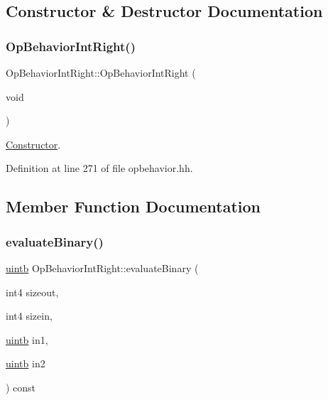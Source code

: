 \subsection{Constructor \& Destructor Documentation}
\mbox{\label{class_op_behavior_int_right_a353091e1e88dcba748526a4f96fad418}} 
\subsubsection{\texorpdfstring{OpBehaviorIntRight()}{OpBehaviorIntRight()}}
{\footnotesize\ttfamily Op\+Behavior\+Int\+Right\+::\+Op\+Behavior\+Int\+Right (\begin{DoxyParamCaption}\item[{void}]{ }\end{DoxyParamCaption})\hspace{0.3cm}{\ttfamily [inline]}}



\mbox{\hyperlink{class_constructor}{Constructor}}. 



Definition at line 271 of file opbehavior.\+hh.



\subsection{Member Function Documentation}
\mbox{\label{class_op_behavior_int_right_a9d85dc8a305522589e394b4b14ff8caa}} 
\subsubsection{\texorpdfstring{evaluateBinary()}{evaluateBinary()}}
{\footnotesize\ttfamily \mbox{\hyperlink{types_8h_a2db313c5d32a12b01d26ac9b3bca178f}{uintb}} Op\+Behavior\+Int\+Right\+::evaluate\+Binary (\begin{DoxyParamCaption}\item[{int4}]{sizeout,  }\item[{int4}]{sizein,  }\item[{\mbox{\hyperlink{types_8h_a2db313c5d32a12b01d26ac9b3bca178f}{uintb}}}]{in1,  }\item[{\mbox{\hyperlink{types_8h_a2db313c5d32a12b01d26ac9b3bca178f}{uintb}}}]{in2 }\end{DoxyParamCaption}) const\hspace{0.3cm}{\ttfamily [virtual]}}




